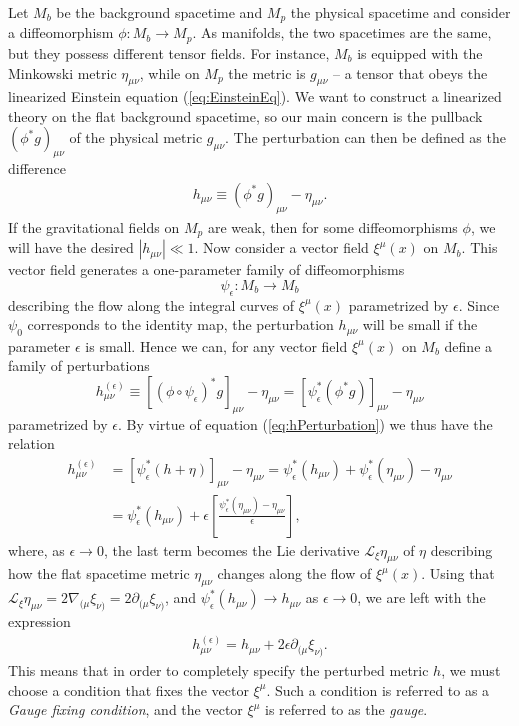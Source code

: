 \documentclass[twoside,utf8]{article}
\begin{document}
Let $M_b$ be the background spacetime and $M_p$ the physical spacetime and consider a diffeomorphism $\phi:M_b \rightarrow M_p$. As manifolds, the two spacetimes are the same, but they possess different tensor fields. For instance, $M_b$ is equipped with the Minkowski metric $\eta_{\mu\nu}$, while on $M_p$ the metric is $g_{\mu\nu}$ -- a tensor that obeys the linearized Einstein equation (\ref{eq:EinsteinEq}). We want to construct a linearized theory on the flat background spacetime, so our main concern is the pullback $(\phi^*g)_{\mu\nu}$ of the physical metric $g_{\mu\nu}$. The perturbation can then be defined as the difference
\begin{align}
h_{\mu\nu} \equiv (\phi^*g)_{\mu\nu}-\eta_{\mu\nu}. \label{eq:hPerturbation}
\end{align}
If the gravitational fields on $M_p$ are weak, then for some diffeomorphisms $\phi$, we will have the desired $|h_{\mu\nu}|\ll 1$. Now consider a vector field $\xi^\mu(x)$ on $M_b$. This vector field generates a one-parameter family of diffeomorphisms
\[
\psi_\epsilon : M_b \rightarrow M_b
\]
describing the flow along the integral curves of $\xi^\mu(x)$ parametrized by $\epsilon$. Since $\psi_0$ corresponds to the identity map, the perturbation $h_{\mu\nu}$ will be small if the parameter $\epsilon$ is small. Hence we can, for any vector field $\xi^\mu(x)$ on $M_b$ define a family of perturbations
\[
h_{\mu\nu}^{(\epsilon)}
\equiv [(\phi \circ  \psi_\epsilon)^*g]_{\mu\nu}-\eta_{\mu\nu}
=      [\psi_\epsilon^*(\phi^*g)]_{\mu\nu}-\eta_{\mu\nu}
\]
parametrized by $\epsilon$. By virtue of equation (\ref{eq:hPerturbation}) we thus have the relation
\begin{align*}
h_{\mu\nu}^{(\epsilon)}
&= [\psi_\epsilon^*(h+\eta)]_{\mu\nu}-\eta_{\mu\nu}
 = \psi_\epsilon^*(h_{\mu\nu})+\psi_\epsilon^*(\eta_{\mu\nu})-\eta_{\mu\nu} \\
&= \psi_\epsilon^*(h_{\mu\nu}) + \epsilon\left[\frac{\psi_\epsilon^*(\eta_{\mu\nu})-\eta_{\mu\nu}}{\epsilon}\right],
\end{align*}
where, as $\epsilon\rightarrow 0$, the last term becomes the Lie derivative $\mathcal{L}_\xi \eta_{\mu\nu}$ of $\eta$ describing how the flat spacetime metric $\eta_{\mu\nu}$ changes along the flow of $\xi^\mu(x)$. Using that $\mathcal{L}_\xi \eta_{\mu\nu} = 2\nabla_{(\mu}\xi_{\nu)}=2\partial_{(\mu}\xi_{\nu)}$, and $\psi_\epsilon^*(h_{\mu\nu}) \rightarrow h_{\mu\nu}$ as $\epsilon \rightarrow 0$, we are left with the expression
\begin{align}
  h_{\mu\nu}^{(\epsilon)} = h_{\mu\nu}+2\epsilon \partial_{(\mu}\xi_{\nu)}. \label{eq:GaugeInvariance}
\end{align}
This means that in order to completely specify the perturbed metric $h$, we must choose a condition that fixes the vector $\xi^\mu$. Such a condition is referred to as a {\it Gauge fixing condition}, and the vector $\xi^\mu$ is referred to as the {\it gauge}.
\end{document}
